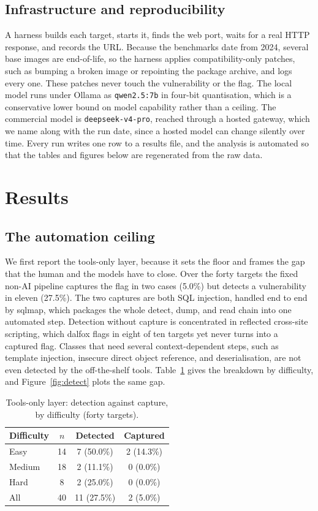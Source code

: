 \documentclass[11pt]{article}
\begin{document}
\subsection{Infrastructure and reproducibility}
A harness builds each target, starts it, finds the web port, waits for a real HTTP response, and records the URL. Because the benchmarks date from 2024, several base images are end-of-life, so the harness applies compatibility-only patches, such as bumping a broken image or repointing the package archive, and logs every one. These patches never touch the vulnerability or the flag. The local model runs under Ollama as \texttt{qwen2.5:7b} in four-bit quantisation, which is a conservative lower bound on model capability rather than a ceiling. The commercial model is \texttt{deepseek-v4-pro}, reached through a hosted gateway, which we name along with the run date, since a hosted model can change silently over time. Every run writes one row to a results file, and the analysis is automated so that the tables and figures below are regenerated from the raw data.

\section{Results}

\subsection{The automation ceiling}
We first report the tools-only layer, because it sets the floor and frames the gap that the human and the models have to close. Over the forty targets the fixed non-AI pipeline captures the flag in two cases (5.0\%) but detects a vulnerability in eleven (27.5\%). The two captures are both SQL injection, handled end to end by sqlmap, which packages the whole detect, dump, and read chain into one automated step. Detection without capture is concentrated in reflected cross-site scripting, which dalfox flags in eight of ten targets yet never turns into a captured flag. Classes that need several context-dependent steps, such as template injection, insecure direct object reference, and deserialisation, are not even detected by the off-the-shelf tools. Table~\ref{tab:detect} gives the breakdown by difficulty, and Figure~\ref{fig:detect} plots the same gap.

\begin{table}[htbp]
\centering
\caption{Tools-only layer: detection against capture, by difficulty (forty targets).}
\label{tab:detect}
\small
\begin{tabular}{@{}lccc@{}}
\toprule
Difficulty & $n$ & Detected & Captured \\
\midrule
Easy   & 14 & 7 (50.0\%) & 2 (14.3\%) \\
Medium & 18 & 2 (11.1\%) & 0 (0.0\%) \\
Hard   & 8  & 2 (25.0\%) & 0 (0.0\%) \\
\midrule
All    & 40 & 11 (27.5\%) & 2 (5.0\%) \\
\bottomrule
\end{tabular}
\end{table}
\end{document}
